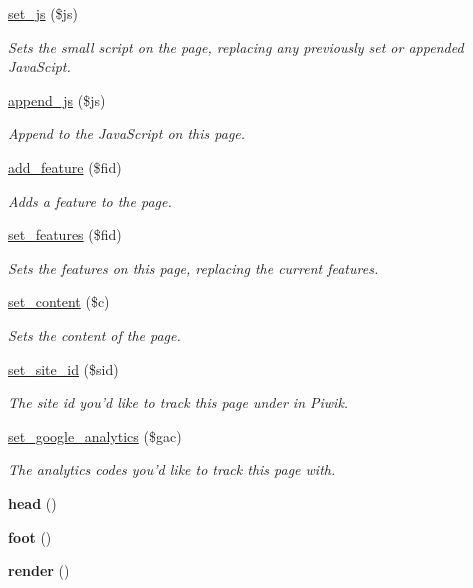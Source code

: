 \begin{DoxyCompactItemize}
\hyperlink{classpage_a7b3ad75f4c2f61b55ec27aff1a41ca93}{set\-\_\-js} (\$js)
\begin{DoxyCompactList}\small\item\em Sets the small script on the page, replacing any previously set or appended Java\-Scipt. \end{DoxyCompactList}\item 
\hyperlink{classpage_a438a833a311c04927ababd5a632d83a7}{append\-\_\-js} (\$js)
\begin{DoxyCompactList}\small\item\em Append to the Java\-Script on this page. \end{DoxyCompactList}\item 
\hyperlink{classpage_a417d01aff00de8193f7f9f6a9eac8635}{add\-\_\-feature} (\$fid)
\begin{DoxyCompactList}\small\item\em Adds a feature to the page. \end{DoxyCompactList}\item 
\hyperlink{classpage_a17f91936047fb8ba40b8dff21d5b2f55}{set\-\_\-features} (\$fid)
\begin{DoxyCompactList}\small\item\em Sets the features on this page, replacing the current features. \end{DoxyCompactList}\item 
\hyperlink{classpage_aeab45580b69b8dc485402dd01694303d}{set\-\_\-content} (\$c)
\begin{DoxyCompactList}\small\item\em Sets the content of the page. \end{DoxyCompactList}\item 
\hyperlink{classpage_a7a090c44f986e6bc76eb5e2e1442aef8}{set\-\_\-site\-\_\-id} (\$sid)
\begin{DoxyCompactList}\small\item\em The site id you'd like to track this page under in Piwik. \end{DoxyCompactList}\item 
\hyperlink{classpage_ab0afa0eb524cf4c4cb00aafab2912564}{set\-\_\-google\-\_\-analytics} (\$gac)
\begin{DoxyCompactList}\small\item\em The analytics codes you'd like to track this page with. \end{DoxyCompactList}\item 
\hypertarget{classpage_a80c80673f7ecafaa6d9d60bde9e8f053}{{\bfseries head} ()}\label{classpage_a80c80673f7ecafaa6d9d60bde9e8f053}

\item 
\hypertarget{classpage_a671fc2de81fe15dd2b2331e1936fac08}{{\bfseries foot} ()}\label{classpage_a671fc2de81fe15dd2b2331e1936fac08}

\item 
\hypertarget{classpage_a6f925742090a0edf6f4c2ac68255a3cb}{{\bfseries render} ()}\label{classpage_a6f925742090a0edf6f4c2ac68255a3cb}

\end{DoxyCompactItemize}


